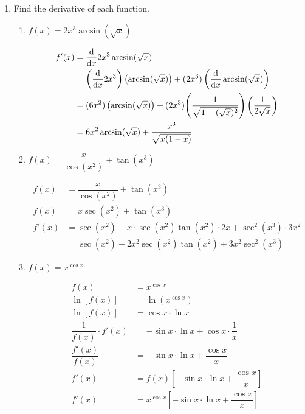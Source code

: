\documentclass{article}
\begin{document}
\begin{enumerate}
\item Find the derivative of each function.
\begin{enumerate}
    \item $f(x)=2x^3\arcsin(\sqrt{x})$
    
    \begin{solution}
        \begin{align*}
        f'(x) &= \diff*{2x^3\arcsin(\sqrt{x})}{x} \\
        &= \left(\diff*{2x^3}{x}\right)\left(\arcsin(\sqrt{x})\right)+(2x^3)\left(\diff*{\arcsin(\sqrt{x})}{x}\right) \\
        &= (6x^2)\left(\arcsin(\sqrt{x})\right) + (2x^3)\Bigg(\frac{1}{\sqrt{1-(\sqrt{x})^2}}\Bigg)\left(\frac{1}{2\sqrt{x}}\right) \\
        &= 6x^2\arcsin(\sqrt{x}) + \frac{x^3}{\sqrt{x(1-x)}}
        \end{align*}

    \end{solution}
    \vfill
    \item $f(x)=\dfrac{x}{\cos(x^2)}+\tan(x^3)$
    
    \begin{solution}
        \begin{align*}
            f(x)&=\dfrac{x}{\cos(x^2)}+\tan(x^3) \\
            f(x)&=x\sec(x^2)+\tan(x^3) \\
            f'(x)&=\sec(x^2)+x\cdot \sec(x^2)\tan(x^2)\cdot2x+\sec^2(x^3)\cdot3x^2\\
            &= \sec(x^2) + 2x^2\sec(x^2)\tan(x^2)+ 3x^2\sec^2(x^3)
        \end{align*}
    \end{solution}
    \vfill
    \item $f(x)=x^{\cos x}$
    
    \begin{solution}
       \begin{align*}
           f(x)&=x^{\cos x}\\
           \ln[f(x)]&=\ln(x^{\cos x})\\
        \ln[f(x)]&=\cos x \cdot \ln x\\
        \dfrac{1}{f(x)}\cdot f'(x)&=-\sin x \cdot \ln x + \cos x \cdot \dfrac{1}{x} \\
        \dfrac{f'(x)}{f(x)}&=-\sin x \cdot \ln x + \dfrac{\cos x}{x}\\
     f'(x)&=f(x)\left[-\sin x \cdot \ln x + \dfrac{\cos x}{x}\right]\\
      f'(x)&=x^{\cos x}\left[-\sin x \cdot \ln x + \dfrac{\cos x}{x}\right]\\
       \end{align*} 
    \end{solution}
    \vfill
\end{enumerate}



\end{enumerate}
\end{document}
